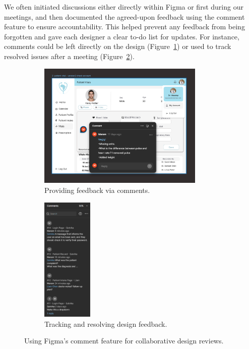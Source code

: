 We often initiated discussions either directly within Figma or first during our meetings, and then documented the agreed-upon feedback using the comment feature to ensure accountability. This helped prevent any feedback from being forgotten and gave each designer a clear to-do list for updates. For instance, comments could be left directly on the design (Figure~\ref{fig:figma-comments-example-direct}) or used to track resolved issues after a meeting (Figure~\ref{fig:figma-comments-example-direct-afmeetings}).
\begin{figure}[htbp]
  \centering
  \captionsetup[subfigure]{labelformat=simple, labelsep=space, justification=centering}
  \renewcommand{\thesubfigure}{(\alph{subfigure})}
  \begin{subfigure}[t]{0.48\linewidth}
    \centering
    \includegraphics[height=6cm]{images03/3-2-2-figure2.png}
    \caption{Providing feedback via comments.}
    \label{fig:figma-comments-example-direct}
  \end{subfigure}\hfill
  \begin{subfigure}[t]{0.48\linewidth}
    \centering
    \includegraphics[height=6cm]{images03/3-2-2-figure3.png}
    \caption{Tracking and resolving design feedback.}
    \label{fig:figma-comments-example-direct-afmeetings}
  \end{subfigure}
  \caption{Using Figma's comment feature for collaborative design reviews.}
  \label{fig:figma-collaboration-comments}
\end{figure}

